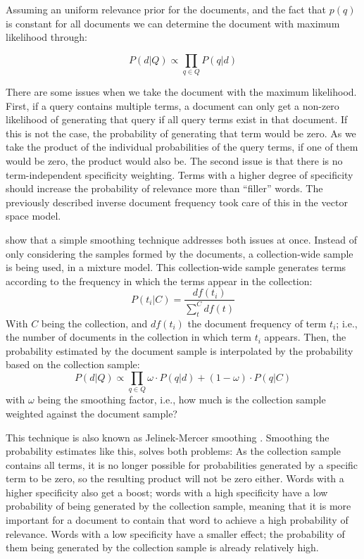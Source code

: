 Assuming an uniform relevance prior for the documents, and the fact  that $p(q)$ is constant for all documents we can determine the document with maximum likelihood through:  

\begin{equation}
	P(d|Q)  \propto \prod_{q \in Q} P(q | d)
\end{equation}

There are some issues when we take the document with the maximum likelihood. First, if a query contains multiple terms, a document can only get a non-zero likelihood of generating that query if all query terms exist in that document. If this is not the case, the probability of generating that term would be zero. As we take the product of the individual probabilities of the query terms, if one of them would be zero, the product would also be. The second issue is that there is no term-independent specificity weighting. Terms with a higher degree of specificity should increase the probability of relevance more than ``filler'' words. The previously described inverse document frequency took care of this in the vector space model.

 show that a simple smoothing technique addresses both issues at once. Instead of only considering the samples formed by the documents, a collection-wide sample is being used, in a mixture model. This collection-wide sample generates terms according to the frequency in which the terms appear in the collection:
\begin{equation}
	P(t_i|C) = \frac{\mathit{df}(t_i)}{\sum_t^C \mathit{df}(t)}
\end{equation}
With $C$ being the collection, and $df(t_i)$ the document frequency of term $t_i$; i.e., the number of documents in the collection in which term $t_i$ appears. Then, the probability estimated by the document sample is interpolated by the probability based on the collection sample:
\begin{equation}
	P(d|Q) \propto \prod_{q \in Q} \omega \cdot P(q | d) + (1 - \omega) \cdot P(q | C) 
\end{equation}
with $\omega$ being the smoothing factor, i.e., how much is the collection sample weighted against the document sample?

This technique is also known as Jelinek-Mercer smoothing \cite{jelinek-mercer}. Smoothing the probability estimates like this, solves both problems: As the collection sample contains all terms, it is no longer possible for probabilities generated by a specific term to be zero, so the resulting product will not be zero either. Words with a higher specificity also get a boost; words with a high specificity have a low probability of being generated by the collection sample, meaning that it is more important for a document to contain that word to achieve a high probability of relevance. Words with a low specificity have a smaller effect; the probability of them being generated by the collection sample is already relatively high. 

